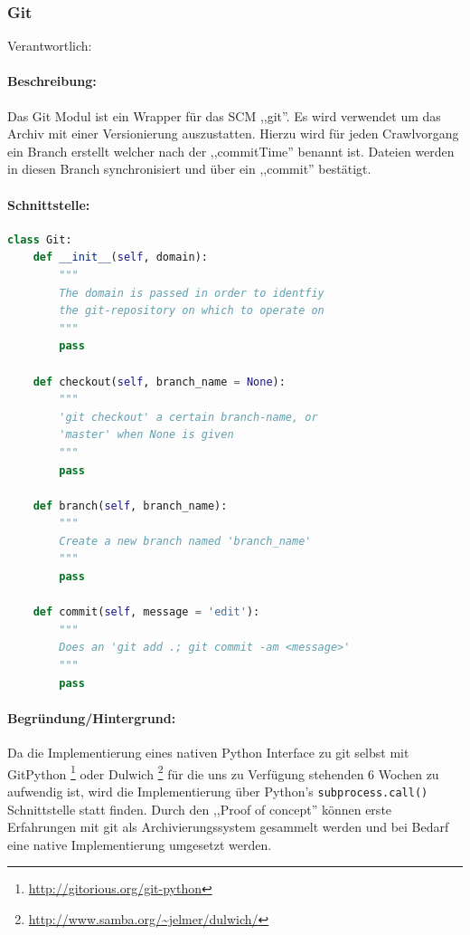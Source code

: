 
\subsubsection{Git}
\label{ssub:git}
Verantwortlich: \ciii 
\paragraph{Beschreibung:}
\label{par:beschreibung_}
Das Git Modul ist ein Wrapper für das SCM ,,git''. Es wird verwendet um das Archiv mit einer Versionierung auszustatten. Hierzu wird für jeden Crawlvorgang ein Branch erstellt welcher nach der ,,commitTime'' benannt ist. 
Dateien werden in diesen Branch synchronisiert und über ein ,,commit'' bestätigt.

\paragraph{Schnittstelle:}
\label{par:schnittstelle_}
\hfill
\begin{lstlisting}[language=python]
class Git:
    def __init__(self, domain):
        """
        The domain is passed in order to identfiy
        the git-repository on which to operate on
        """
        pass

    def checkout(self, branch_name = None):
        """
        'git checkout' a certain branch-name, or 
        'master' when None is given
        """
        pass

    def branch(self, branch_name):
        """
        Create a new branch named 'branch_name'
        """
        pass

    def commit(self, message = 'edit'):
        """
        Does an 'git add .; git commit -am <message>'
        """
        pass
\end{lstlisting}

\paragraph{Begründung/Hintergrund:}
\label{par:begr_ndung_hintergrund_}
Da die Implementierung eines nativen Python Interface zu git selbst mit GitPython
\footnote{\url{http://gitorious.org/git-python}} oder Dulwich \footnote{\url{http://www.samba.org/~jelmer/dulwich/}}
für die uns zu Verfügung stehenden 6 Wochen zu aufwendig ist, wird die Implementierung über
Python's \texttt{subprocess.call()} Schnittstelle statt finden. Durch den ,,Proof of concept'' können
erste Erfahrungen mit git als Archivierungssystem gesammelt werden und bei Bedarf eine native Implementierung
umgesetzt werden.

